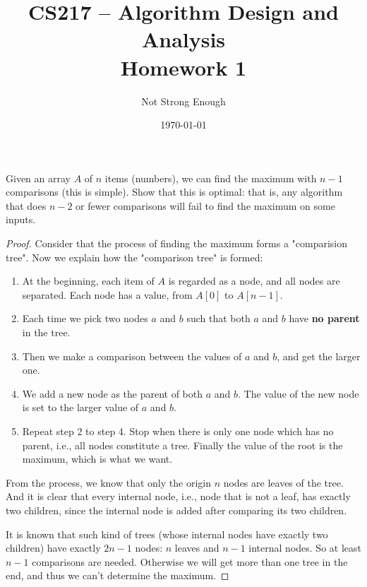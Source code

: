 \documentclass[UTF8, a4paper, linespread=1.5]{article}
\title{CS217 -- Algorithm Design and Analysis \\ Homework 1}
\date{\today}
\author{Not Strong Enough}
\begin{document}
\maketitle

\begin{thm}{}{}
    Given an array $A$ of $n$ items (numbers), we can find the maximum with $n - 1$ comparisons (this is simple). Show that this is optimal: that is, any algorithm that does $n - 2$ or fewer comparisons will fail to find the maximum on some inputs.
\end{thm}
\begin{proof}
    Consider that the process of finding the maximum forms a "comparision tree". Now we explain how the "comparison tree" is formed:
    
    \begin{enumerate}
        \item At the beginning, each item of $A$ is regarded as a node, and all nodes are separated. Each node has a value, from $A[0]$ to $A[n - 1]$.
        \item Each time we pick two nodes $a$ and $b$ such that both $a$ and $b$ have \textbf{no parent} in the tree.
        \item Then we make a comparison between the values of $a$ and $b$, and get the larger one. 
        \item We add a new node as the parent of both $a$ and $b$. The value of the new node is set to the larger value of $a$ and $b$.
        \item Repeat step 2 to step 4. Stop when there is only one node which has no parent, i.e., all nodes constitute a tree. Finally the value of the root is the maximum, which is what we want.
    \end{enumerate}
    
    From the process, we know that only the origin $n$ nodes are leaves of the tree. And it is clear that every internal node, i.e., node that is not a leaf, has exactly two children, since the internal node is added after comparing its two children.
    
    It is known that such kind of trees (whose internal nodes have exactly two children) have exactly $2n - 1$ nodes: $n$ leaves and $n - 1$ internal nodes. So at least $n - 1$ comparisons are needed. Otherwise we will get more than one tree in the end, and thus we can't determine the maximum.
\end{proof}

\newpage
\end{document}
